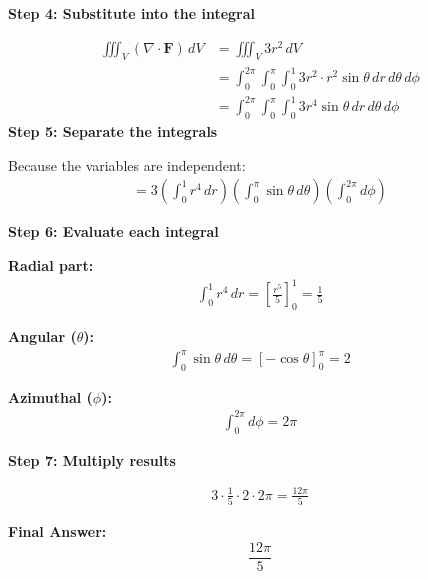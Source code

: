 \begin{examplebox}
    \textbf{Step 4: Substitute into the integral}

    \begin{align*}
        \iiint_V (\nabla \cdot \mathbf{F})\, dV
         & = \iiint_V 3r^2\, dV                                                           \\
         & = \int_0^{2\pi}\int_0^\pi\int_0^1 3r^2 \cdot r^2\sin\theta\,dr\,d\theta\,d\phi \\
         & = \int_0^{2\pi}\int_0^\pi\int_0^1 3r^4\sin\theta\,dr\,d\theta\,d\phi
    \end{align*}
    \textbf{Step 5: Separate the integrals}

    Because the variables are independent:
    \begin{align*}
        = 3 \left(\int_0^1 r^4\,dr\right)
        \left(\int_0^\pi \sin\theta\,d\theta\right)
        \left(\int_0^{2\pi} d\phi\right)
    \end{align*}

    \textbf{Step 6: Evaluate each integral}

    \textbf{Radial part:}
    \begin{align*}
        \int_0^1 r^4\,dr = \left[\frac{r^5}{5}\right]_0^1 = \frac{1}{5}
    \end{align*}

    \textbf{Angular ($\theta$):}
    \begin{align*}
        \int_0^\pi \sin\theta\,d\theta = [-\cos\theta]_0^\pi = 2
    \end{align*}

    \textbf{Azimuthal ($\phi$):}
    \begin{align*}
        \int_0^{2\pi} d\phi = 2\pi
    \end{align*}

    \textbf{Step 7: Multiply results}

    \begin{align*}
        3 \cdot \frac{1}{5} \cdot 2 \cdot 2\pi = \frac{12\pi}{5}
    \end{align*}

    \textbf{Final Answer:}
    \[
        \boxed{\frac{12\pi}{5}}
    \]

\end{examplebox}